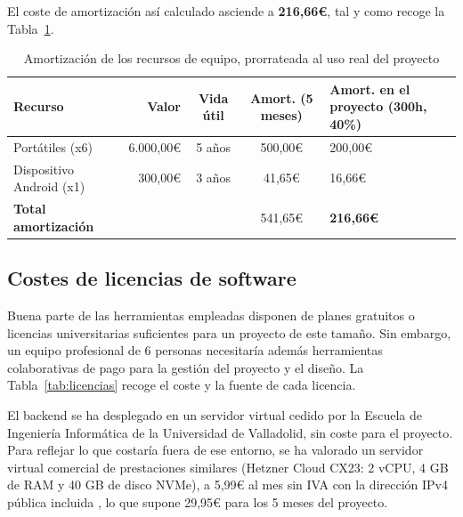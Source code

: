 El coste de amortización así calculado asciende a \textbf{216,66€}, tal y como recoge la Tabla~\ref{tab:amortizacion}.

\begin{table}[ht!]
\centering
\begin{tabularx}{\textwidth}{|X|r|c|c|X|}
\hline
\textbf{Recurso} & \textbf{Valor} & \textbf{Vida útil} & \textbf{Amort. (5 meses)} & \textbf{Amort. en el proyecto (300h, 40\%)} \\
\hline
Portátiles (x6) & 6.000,00€ & 5 años & 500,00€ & 200,00€ \\
\hline
Dispositivo Android (x1) & 300,00€ & 3 años & 41,65€ & 16,66€ \\
\hline
\textbf{Total amortización} & & & 541,65€ & \textbf{216,66€} \\
\hline
\end{tabularx}
\caption{Amortización de los recursos de equipo, prorrateada al uso real del proyecto}
\label{tab:amortizacion}
\end{table}

\subsection{Costes de licencias de software}

Buena parte de las herramientas empleadas disponen de planes gratuitos o licencias universitarias suficientes para un proyecto de este tamaño. Sin embargo, un equipo profesional de 6 personas necesitaría además herramientas colaborativas de pago para la gestión del proyecto y el diseño. La Tabla~\ref{tab:licencias} recoge el coste y la fuente de cada licencia.

El backend se ha desplegado en un servidor virtual cedido por la Escuela de Ingeniería Informática de la Universidad de Valladolid, sin coste para el proyecto. Para reflejar lo que costaría fuera de ese entorno, se ha valorado un servidor virtual comercial de prestaciones similares (Hetzner Cloud CX23: 2 vCPU, 4 GB de RAM y 40 GB de disco NVMe), a 5,99€ al mes sin IVA con la dirección IPv4 pública incluida \cite{hetznerPricing}, lo que supone 29,95€ para los 5 meses del proyecto.

